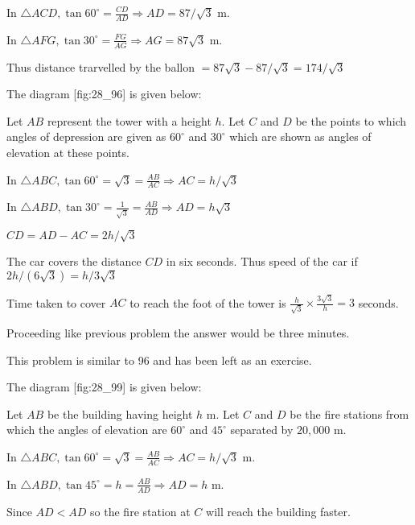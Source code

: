   In $\triangle ACD, \tan60^\circ = \frac{CD}{AD} \Rightarrow AD = 87/\sqrt{3}$ m.

  In $\triangle AFG, \tan30^\circ = \frac{FG}{AG} \Rightarrow AG = 87\sqrt{3}$ m.

  Thus distance trarvelled by the ballon $= 87\sqrt{3} - 87/\sqrt{3} = 174/\sqrt{3}$

\item The diagram [fig:28_96] is given below:

  \startplacefigure[reference=fig:28_96]
    \externalfigure[28_96.pdf]
  \stopplacefigure

  Let $AB$ represent the tower with a height $h$. Let $C$ and $D$ be the points to which angles of
  depression are given as $60^\circ$ and $30^\circ$ which are shown as angles of elevation at these points.

  In $\triangle ABC, \tan60^\circ = \sqrt{3} = \frac{AB}{AC} \Rightarrow AC = h/\sqrt{3}$

  In $\triangle ABD, \tan30^\circ = \frac{1}{\sqrt{3}} = \frac{AB}{AD} \Rightarrow AD = h\sqrt{3}$

  $CD = AD - AC = 2h/\sqrt{3}$

  The car covers the distance $CD$ in six seconds. Thus speed of the car if $2h/(6\sqrt{3}) = h/3\sqrt{3}$

  Time taken to cover $AC$ to reach the foot of the tower is $\frac{h}{\sqrt{3}}\times\frac{3\sqrt{3}}{h} = 3$
  seconds.

\item Proceeding like previous problem the answer would be three minutes.

\item This problem is similar to 96 and has been left as an exercise.

\item The diagram [fig:28_99] is given below:

  \startplacefigure[reference=fig:28_99]
    \externalfigure[28_99.pdf]
  \stopplacefigure

  Let $AB$ be the building having height $h$ m. Let $C$ and $D$ be the fire stations from which the
  angles of elevation are $60^\circ$ and $45^\circ$ separated by $20,000$ m.

  In $\triangle ABC, \tan60^\circ = \sqrt{3} = \frac{AB}{AC}\Rightarrow AC = h/\sqrt{3}$ m.

  In $\triangle ABD, \tan45^\circ = h = \frac{AB}{AD}\Rightarrow AD = h$ m.

  Since $AD < AD$ so the fire station at $C$ will reach the building faster.

